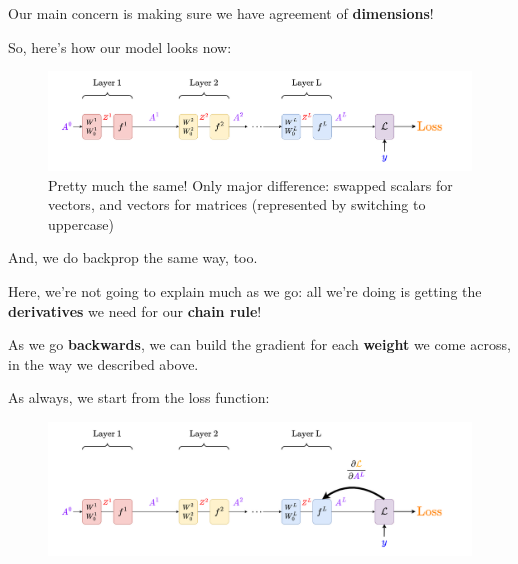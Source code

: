         
        
        
        
        
        
        Our main concern is making sure we have agreement of \textbf{dimensions}!
    
        So, here's how our model looks now:
        
        \begin{figure}[H]
            \centering
            \includegraphics[width=180mm,scale=0.4]{images/nn_1_5_images/network_bp_full.png}
            \caption*{Pretty much the same! Only major difference: swapped scalars for vectors, and vectors for matrices (represented by switching to uppercase)}
        \end{figure}
        
        And, we do backprop the same way, too.
        
        Here, we're not going to explain much as we go: all we're doing is getting the \textbf{derivatives} we need for our \textbf{chain rule}! 
        
        As we go \textbf{backwards}, we can build the gradient for each \textbf{weight} we come across, in the way we described above.
        
        As always, we start from the loss function:
        
        \begin{figure}[H]
            \centering
            \includegraphics[width=180mm,scale=0.4]{images/nn_1_5_images/network_bp_full1.png}
        \end{figure}
        
